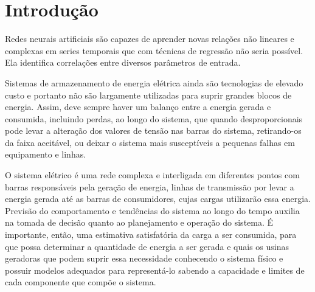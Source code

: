 \documentclass[
	12pt,				%
	oneside,			%
	a4paper,			%
	english,			%
	brazil				%
	]{abntex2}
\begin{document}
\tableofcontents*
\clearpage



\textual

\chapter{Introdução}


	Redes neurais artificiais são capazes de aprender novas relações não lineares e complexas em series temporais que com técnicas de regressão não seria possível. Ela identifica correlações entre diversos parâmetros de entrada.  




	
	
	Sistemas de armazenamento de energia elétrica ainda são tecnologias de elevado custo e portanto não são largamente utilizadas para suprir grandes blocos de energia. Assim, deve sempre haver um balanço entre a energia gerada e consumida, incluindo perdas, ao longo do sistema, que quando desproporcionais pode levar a alteração dos valores de tensão nas barras do sistema, retirando-os da faixa aceitável, ou deixar o sistema mais susceptíveis a pequenas falhas em equipamento e linhas. 
	
	O sistema elétrico é uma rede complexa e interligada em diferentes pontos com barras responsáveis pela geração de energia, linhas de transmissão por levar a energia gerada até as barras de consumidores, cujas cargas utilizarão essa energia. Previsão do comportamento e tendências do sistema ao longo do tempo auxilia na tomada de decisão quanto ao planejamento e operação do sistema. É importante, então, uma estimativa satisfatória da carga a ser consumida, para que possa determinar a quantidade de energia a ser gerada e quais os usinas geradoras que podem suprir essa necessidade conhecendo o sistema físico e possuir modelos adequados para representá-lo sabendo a capacidade e limites de cada componente que compõe o sistema.
	
\end{document}
